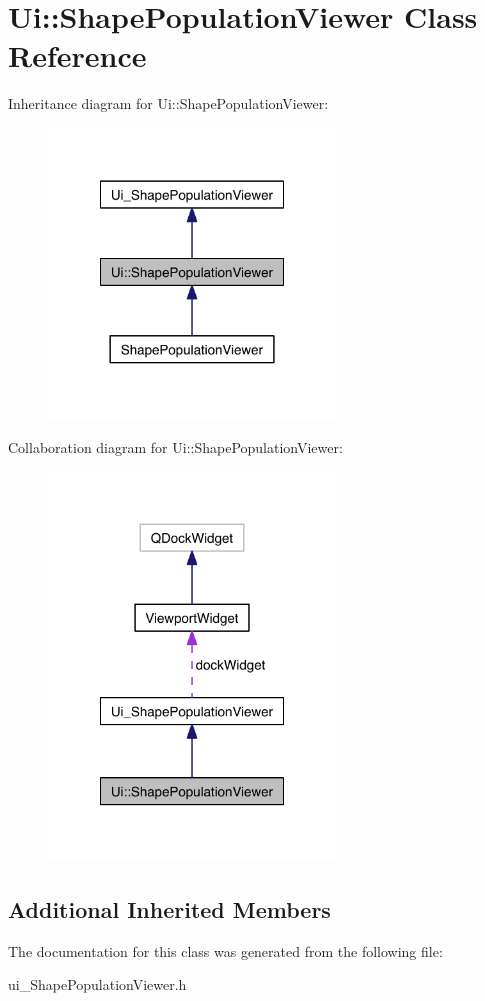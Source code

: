 \hypertarget{class_ui_1_1_shape_population_viewer}{\section{Ui\-:\-:Shape\-Population\-Viewer Class Reference}
\label{class_ui_1_1_shape_population_viewer}
}


Inheritance diagram for Ui\-:\-:Shape\-Population\-Viewer\-:\nopagebreak
\begin{figure}[H]
\begin{center}
\leavevmode
\includegraphics[width=216pt]{class_ui_1_1_shape_population_viewer__inherit__graph}
\end{center}
\end{figure}


Collaboration diagram for Ui\-:\-:Shape\-Population\-Viewer\-:\nopagebreak
\begin{figure}[H]
\begin{center}
\leavevmode
\includegraphics[width=216pt]{class_ui_1_1_shape_population_viewer__coll__graph}
\end{center}
\end{figure}
\subsection*{Additional Inherited Members}


The documentation for this class was generated from the following file\-:\begin{DoxyCompactItemize}
\item 
ui\-\_\-\-Shape\-Population\-Viewer.\-h\end{DoxyCompactItemize}
